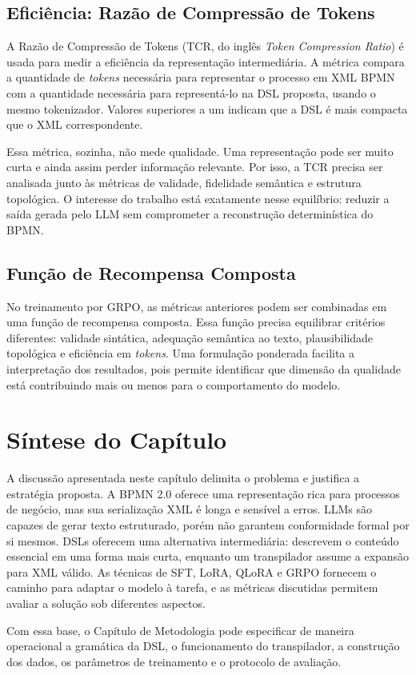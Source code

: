 \subsection{Eficiência: Razão de Compressão de Tokens}
\label{subsec:tcr}

A Razão de Compressão de Tokens (TCR, do inglês \textit{Token Compression Ratio}) é usada para medir a eficiência da representação intermediária. A métrica compara a quantidade de \textit{tokens} necessária para representar o processo em XML BPMN com a quantidade necessária para representá-lo na DSL proposta, usando o mesmo tokenizador. Valores superiores a um indicam que a DSL é mais compacta que o XML correspondente.

Essa métrica, sozinha, não mede qualidade. Uma representação pode ser muito curta e ainda assim perder informação relevante. Por isso, a TCR precisa ser analisada junto às métricas de validade, fidelidade semântica e estrutura topológica. O interesse do trabalho está exatamente nesse equilíbrio: reduzir a saída gerada pelo LLM sem comprometer a reconstrução determinística do BPMN.

\subsection{Função de Recompensa Composta}
\label{subsec:recompensa-composta}

No treinamento por GRPO, as métricas anteriores podem ser combinadas em uma função de recompensa composta. Essa função precisa equilibrar critérios diferentes: validade sintática, adequação semântica ao texto, plausibilidade topológica e eficiência em \textit{tokens}. Uma formulação ponderada facilita a interpretação dos resultados, pois permite identificar que dimensão da qualidade está contribuindo mais ou menos para o comportamento do modelo.

\section{Síntese do Capítulo}
\label{sec:sintese-fundamentacao}

A discussão apresentada neste capítulo delimita o problema e justifica a estratégia proposta. A BPMN 2.0 oferece uma representação rica para processos de negócio, mas sua serialização XML é longa e sensível a erros. LLMs são capazes de gerar texto estruturado, porém não garantem conformidade formal por si mesmos. DSLs oferecem uma alternativa intermediária: descrevem o conteúdo essencial em uma forma mais curta, enquanto um transpilador assume a expansão para XML válido. As técnicas de SFT, LoRA, QLoRA e GRPO fornecem o caminho para adaptar o modelo à tarefa, e as métricas discutidas permitem avaliar a solução sob diferentes aspectos.

Com essa base, o Capítulo de Metodologia pode especificar de maneira operacional a gramática da DSL, o funcionamento do transpilador, a construção dos dados, os parâmetros de treinamento e o protocolo de avaliação.
